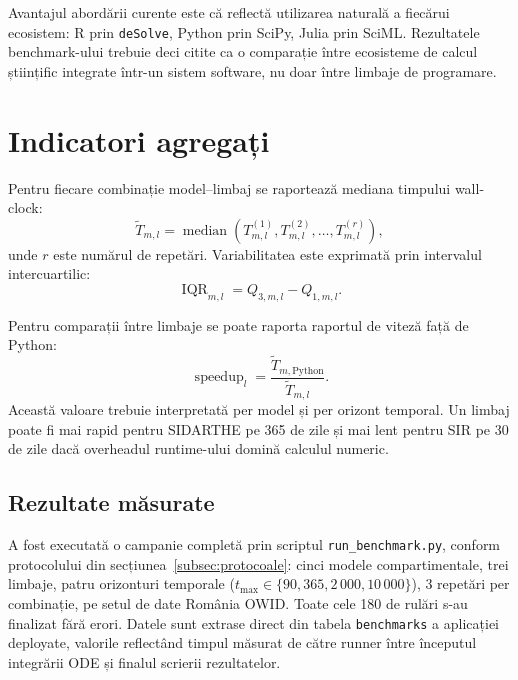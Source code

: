 Avantajul abordării curente este că reflectă utilizarea naturală a fiecărui
ecosistem: R prin \texttt{deSolve}, Python prin SciPy, Julia prin SciML.
Rezultatele benchmark-ului trebuie deci citite ca o comparație între ecosisteme de
calcul științific integrate într-un sistem software, nu doar între limbaje de
programare.

\section{Indicatori agregați}
\label{sec:indicatori_agregati}

Pentru fiecare combinație model--limbaj se raportează mediana timpului wall-clock:
\begin{equation}
\widetilde{T}_{m,l} = \operatorname{median}
\left(T_{m,l}^{(1)}, T_{m,l}^{(2)}, \ldots, T_{m,l}^{(r)}\right),
\end{equation}
unde $r$ este numărul de repetări. Variabilitatea este exprimată prin intervalul
intercuartilic:
\begin{equation}
\operatorname{IQR}_{m,l}=Q_{3,m,l}-Q_{1,m,l}.
\end{equation}

Pentru comparații între limbaje se poate raporta raportul de viteză față de
Python:
\begin{equation}
\operatorname{speedup}_{l} =
\frac{\widetilde{T}_{m,\text{Python}}}{\widetilde{T}_{m,l}}.
\end{equation}
Această valoare trebuie interpretată per model și per orizont temporal. Un limbaj
poate fi mai rapid pentru SIDARTHE pe 365 de zile și mai lent pentru SIR pe 30 de
zile dacă overheadul runtime-ului domină calculul numeric.

\subsection{Rezultate măsurate}
\label{subsec:rezultate_masurate}

A fost executată o campanie completă prin scriptul
\texttt{run\_benchmark.py}, conform protocolului din
secțiunea~\ref{subsec:protocoale}: cinci modele compartimentale, trei limbaje,
patru orizonturi temporale ($t_{\max} \in \{90, 365, 2\,000, 10\,000\}$),
3 repetări per combinație, pe setul de date România OWID. Toate cele 180 de
rulări s-au finalizat fără erori. Datele sunt extrase direct din tabela
\texttt{benchmarks} a aplicației deployate, valorile reflectând timpul măsurat
de către runner între începutul integrării ODE și finalul scrierii rezultatelor.


